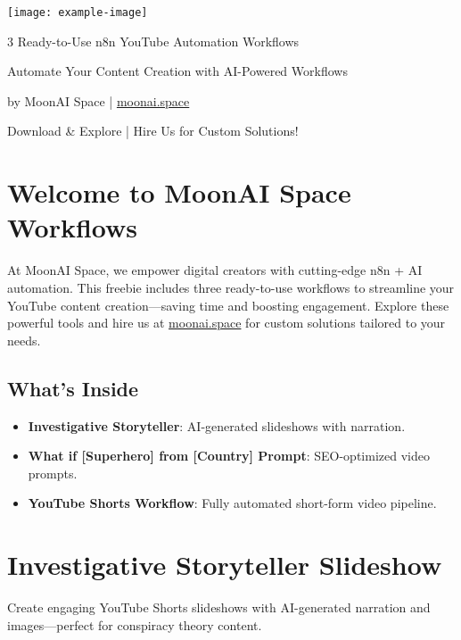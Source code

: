 \documentclass[a4paper,10pt]{article}
\begin{document}
\thispagestyle{empty}

\begin{center}
    \vspace*{2cm}
    \texttt{[image: example-image]} %
    \vspace{1cm}
    {\Huge\color{neoncyan} 3 Ready-to-Use n8n YouTube Automation Workflows\par}
    \vspace{0.5cm}
    {\Large\color{spacewhite} Automate Your Content Creation with AI-Powered Workflows\par}
    \vspace{1cm}
    {\color{spacewhite} by MoonAI Space | \href{https://moonai.space}{moonai.space}\par}
    \vspace{2cm}
    {\color{neonmagenta} Download \& Explore | Hire Us for Custom Solutions!\par}
\end{center}
\newpage

\section*{Welcome to MoonAI Space Workflows}
\color{spacewhite}
At MoonAI Space, we empower digital creators with cutting-edge n8n + AI automation. This freebie includes three ready-to-use workflows to streamline your YouTube content creation—saving time and boosting engagement. Explore these powerful tools and hire us at \href{https://moonai.space}{moonai.space} for custom solutions tailored to your needs.

\subsection*{What’s Inside}
\begin{itemize}[label={\color{neoncyan}$\bullet$}]
    \item \textbf{Investigative Storyteller}: AI-generated slideshows with narration.
    \item \textbf{What if [Superhero] from [Country] Prompt}: SEO-optimized video prompts.
    \item \textbf{YouTube Shorts Workflow}: Fully automated short-form video pipeline.
\end{itemize}
\newpage

\section{Investigative Storyteller Slideshow}
\color{spacewhite}
Create engaging YouTube Shorts slideshows with AI-generated narration and images—perfect for conspiracy theory content.
\end{document}
